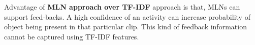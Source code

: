 Advantage of {\bf MLN approach over TF-IDF} approach is that, MLNs can support feed-backs.
A high confidence of an activity can increase probability of object being present in that particular clip. 
This kind of feedback information cannot be captured using TF-IDF features.

\begin{comment}
Table \ref{table:SVM_Setup} shows APs for all classes as per SVM setup of this project.

\begin{table}[t,here]
\centering
\captionsetup{justification=centering,margin=2cm}
\begin{tabular}{| l | c | c |}
\hline
{\bf Activity Class} & {\bf AP as per Paper} & {\bf AP as per project} \\ \hline
%
AnswerPhone & 8.80\% & 11.36\% \\ \hline
DriveCar & 74.90\% & 66.96\% \\ \hline
Eat & 26.30\% & 45.45\% \\ \hline
FightPerson & 67.50\% & 57.63\% \\ \hline
GetOutCar & 9.00\% & 17.86\% \\ \hline
HandShake & 11.60\% & 25.93\% \\ \hline
HugPerson & 13.50\% & 15.15\% \\ \hline
Kiss & 49.60\% & 18.18\% \\ \hline
Run & 53.70\% & 38.78\% \\ \hline
SitDown & 31.60\% & 40.96\% \\ \hline
SitUp & 7.20\% & 5.26\% \\ \hline
StandUp & 35\% & 35.20\% \\ \hline
Average AP & 32.39\% & 31.56\% \\ \hline
%
\end{tabular}
\caption{Average precision for Basic SVM Setup - without using tf-idf features}
\label{table:SVM_Setup}
\end{table}
\end{comment}
